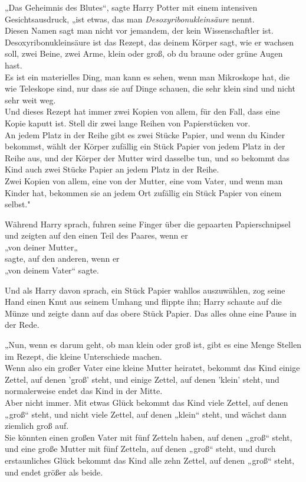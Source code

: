 {„Das Geheimnis des Blutes“, sagte Harry Potter mit einem intensiven Gesichtsausdruck, „ist etwas, das man \emph{Desoxyribonukleinsäure} nennt.\\ Diesen Namen sagt man nicht vor jemandem, der kein Wissenschaftler ist. Desoxyribonukleinsäure ist das Rezept, das deinem Körper sagt, wie er wachsen soll, zwei Beine, zwei Arme, klein oder groß, ob du braune oder grüne Augen hast.\\ Es ist ein materielles Ding, man kann es sehen, wenn man Mikroskope hat, die wie Teleskope sind, nur dass sie auf Dinge schauen, die sehr klein sind und nicht sehr weit weg.\\ Und dieses Rezept hat immer zwei Kopien von allem, für den Fall, dass eine Kopie kaputt ist. Stell dir zwei lange Reihen von Papierstücken vor.\\ An jedem Platz in der Reihe gibt es zwei Stücke Papier, und wenn du Kinder bekommst, wählt der Körper zufällig ein Stück Papier von jedem Platz in der Reihe aus, und der Körper der Mutter wird dasselbe tun, und so bekommt das Kind auch zwei Stücke Papier an jedem Platz in der Reihe.\\ Zwei Kopien von allem, eine von der Mutter, eine vom Vater, und wenn man Kinder hat, bekommen sie an jedem Ort zufällig ein Stück Papier von einem selbst."

Während Harry sprach, fuhren seine Finger über die gepaarten Papierschnipsel und zeigten auf den einen Teil des Paares, wenn er\\ „von deiner Mutter„\\ sagte, auf den anderen, wenn er\\ „von deinem Vater“ sagte.

Und als Harry davon sprach, ein Stück Papier wahllos auszuwählen, zog seine Hand einen Knut aus seinem Umhang und flippte ihn; Harry schaute auf die Münze und zeigte dann auf das obere Stück Papier. Das alles ohne eine Pause in der Rede.

„Nun, wenn es darum geht, ob man klein oder groß ist, gibt es eine Menge Stellen im Rezept, die kleine Unterschiede machen.\\ Wenn also ein großer Vater eine kleine Mutter heiratet, bekommt das Kind einige Zettel, auf denen 'groß' steht, und einige Zettel, auf denen 'klein' steht, und normalerweise endet das Kind in der Mitte.\\ Aber nicht immer. Mit etwas Glück bekommt das Kind viele Zettel, auf denen\\ „groß“ steht, und nicht viele Zettel, auf denen „klein“ steht, und wächst dann ziemlich groß auf.\\ Sie könnten einen großen Vater mit fünf Zetteln haben, auf denen „groß“ steht, und eine große Mutter mit fünf Zetteln, auf denen „groß“ steht, und durch erstaunliches Glück bekommt das Kind alle zehn Zettel, auf denen „groß“ steht, und endet größer als beide.

}
